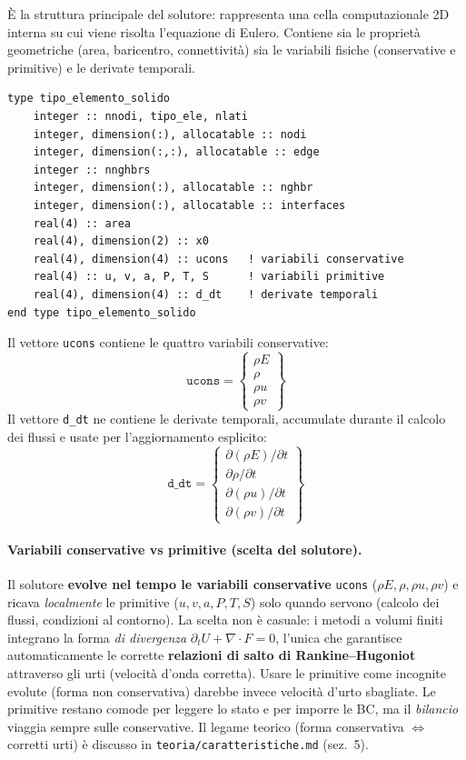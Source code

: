 È la struttura principale del solutore: rappresenta una cella
computazionale 2D interna su cui viene risolta l'equazione di Eulero.
Contiene sia le proprietà geometriche (area, baricentro, connettività)
sia le variabili fisiche (conservative e primitive) e le derivate
temporali.

\begin{lstlisting}[style=fortran]
type tipo_elemento_solido
    integer :: nnodi, tipo_ele, nlati
    integer, dimension(:), allocatable :: nodi
    integer, dimension(:,:), allocatable :: edge
    integer :: nnghbrs
    integer, dimension(:), allocatable :: nghbr
    integer, dimension(:), allocatable :: interfaces
    real(4) :: area
    real(4), dimension(2) :: x0
    real(4), dimension(4) :: ucons   ! variabili conservative
    real(4) :: u, v, a, P, T, S      ! variabili primitive
    real(4), dimension(4) :: d_dt    ! derivate temporali
end type tipo_elemento_solido
\end{lstlisting}

Il vettore \texttt{ucons} contiene le quattro variabili conservative:
\[
\mathtt{ucons} =
\begin{Bmatrix} \rho E \\ \rho \\ \rho u \\ \rho v \end{Bmatrix}
\]
Il vettore \texttt{d\_dt} ne contiene le derivate temporali, accumulate
durante il calcolo dei flussi e usate per l'aggiornamento esplicito:
\[
\mathtt{d\_dt} =
\begin{Bmatrix}
  \partial(\rho E)/\partial t \\
  \partial\rho/\partial t \\
  \partial(\rho u)/\partial t \\
  \partial(\rho v)/\partial t
\end{Bmatrix}
\]

\paragraph{Variabili conservative vs primitive (scelta del solutore).}
Il solutore \textbf{evolve nel tempo le variabili conservative} \texttt{ucons}
($\rho E,\rho,\rho u,\rho v$) e ricava \emph{localmente} le primitive
($u,v,a,P,T,S$) solo quando servono (calcolo dei flussi, condizioni al
contorno). La scelta non è casuale: i metodi a volumi finiti integrano la
forma \emph{di divergenza} $\partial_t U+\nabla\!\cdot F=0$, l'unica che
garantisce automaticamente le corrette \textbf{relazioni di salto di
Rankine--Hugoniot} attraverso gli urti (velocità d'onda corretta). Usare le
primitive come incognite evolute (forma non conservativa) darebbe invece
velocità d'urto sbagliate. Le primitive restano comode per leggere lo stato e
per imporre le BC, ma il \emph{bilancio} viaggia sempre sulle conservative.
Il legame teorico (forma conservativa $\Leftrightarrow$ corretti urti) è
discusso in \texttt{teoria/caratteristiche.md} (sez.~5).

